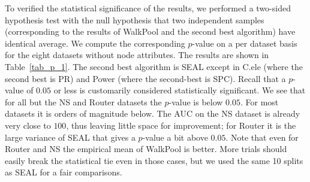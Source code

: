 \documentclass[11pt]{article}
\newcommand{\UPDATE}[1]{\textcolor{WowColor}{{#1}}}
\renewcommand{\UPDATE}[1]{#1}
\begin{document}
\UPDATE{To verified the statistical significance of the results, we performed a two-sided hypothesis test with the null hypothesis that two independent samples (corresponding to the results of WalkPool and the second best algorithm) have identical average. We compute the corresponding $p$-value on a per dataset basis for the eight datasets without node attributes. The results are shown in Table~\ref{tab_p_1}. The second best algorithm is SEAL except in C.ele (where the second best is PR) and Power (where the second-best is SPC). 
Recall that a $p$-value of $0.05$ or less is customarily considered statistically significant. We see that for all but the NS and Router datasets the $p$-value is below $0.05$. For most datasets it is orders of magnitude below. The AUC on the NS dataset is already very close to $100$, thus leaving little space for improvement; for Router it is the large variance of SEAL that gives a $p$-value a bit above $0.05$. Note that even for Router and NS the empirical mean of WalkPool is better. More trials should easily break the statistical tie even in those cases, but we used the same 10 splits as SEAL for a fair comparisons.}

\addtolength{\tabcolsep}{-3pt}
\begin{table}[!]
\centering
{}
\caption{$p$-value by comparing WP and second best algorithm on eight datasets with no attributes.}
\label{tab_p_1}
\end{table}
\addtolength{\tabcolsep}{3pt}
\end{document}
